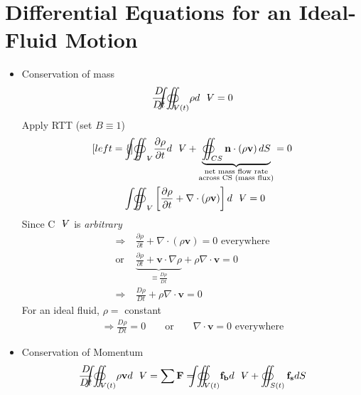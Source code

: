 \section{Differential Equations for an Ideal-Fluid Motion}
\begin{itemize}
\item Conservation of mass
\[
\frac{D}{Dt}{\oiint \hspace{-23.5pt} \int}_{\volume (t)}\rho d\volume = 0
\]
Apply RTT (set $B\equiv 1$) 
\begin{subequations}
\begin{align}[left = \empheqlbrace\,]
&{\oiint \hspace{-23.5pt} \int}_{C\volume}\frac{\partial\rho}{\partial t} d\volume + \underbrace{\oiint_{CS}\mathbf{n}\cdot\left(\rho \mathbf{v}\right)dS}_
{
\begin{subarray}{c}
  \text{net mass flow rate}\\
  \text{across CS (mass flux)}
\end{subarray}
}
= 0 \\
&{\oiint \hspace{-23.5pt} \int}_{C\volume}\left[\frac{\partial\rho}{\partial t} + \nabla\cdot\left(\rho\mathbf{v}\right)\right]d\volume = 0
\end{align}
\end{subequations}
Since C$\volume$ is \emph{arbitrary}
\begin{subequations}
\begin{align}
\Longrightarrow &\boxed{\frac{\partial\rho}{\partial t} + \nabla\cdot\left(\rho\mathbf{v}\right) = 0}\text{ everywhere} \\
\text{or }&\underbrace{\frac{\partial\rho}{\partial t}+\mathbf{v}\cdot\nabla\rho}_{\displaystyle\equiv\frac{D\rho}{Dt}} + \rho\nabla\cdot\mathbf{v} = 0\nonumber \\
\Longrightarrow & \frac{D\rho}{Dt} + \rho\nabla\cdot\mathbf{v} = 0
\end{align}
\end{subequations}
For an ideal fluid, $\rho =$ constant
\begin{align}
\Longrightarrow \frac{D\rho}{Dt} = 0&&\text{ or }&&\boxed{\nabla\cdot\mathbf{v} = 0}\text{ everywhere}
\end{align}
\item Conservation of Momentum
\begin{equation}
\frac{D}{Dt}{\oiint \hspace{-23.5pt} \int}_{\volume (t)}\rho\mathbf{v}d\volume = \sum\mathbf{F} = {\oiint \hspace{-23.5pt} \int}_{\volume (t)}\mathbf{f_b}d\volume + \oiint_{S(t)}\mathbf{f_s}dS

\end{equation}
\end{itemize}

